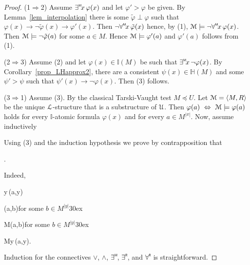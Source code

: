 \documentclass[10pt,oneside]{amsproc}
\begin{document}
\begin{proof}
  (1$\Rightarrow$2) Assume $\existsM x\,\varphi(x)$ and let $\varphi'>\varphi$ be given.
  By Lemma~\ref{lem_interpolation} there is some $\tilde{\varphi}\perp\varphi$ such that  $\varphi(x)\rightarrow\neg\tilde{\varphi}(x)\rightarrow\varphi'(x)$.
  Then $\neg\forallM x\,\tilde{\varphi}(x)$ hence, by (1), ${\EuScript M}\models\neg\forallM x\,\varphi(x)$.
  Then ${\EuScript M}\models\neg\tilde{\varphi}(a)$ for some $a\in M$. Hence ${\EuScript M}\models\varphi'(a)$ and $\varphi'(a)$ follows from (1).

  (2$\Rightarrow$3)
  Assume (2) and let $\varphi(x)\in\mathds{I}(M)$ be such that $\existsM x\,\neg\varphi(x)$.
  By Corollary~\ref{prop_LHapprox2}, there are a consistent $\psi(x)\in\mathds{H}(M)$ and some $\psi'>\psi$ such that $\psi'(x)\rightarrow\neg\varphi(x)$.
  Then (3) follows.

  (3$\Rightarrow$1)
  Assume (3).
  By the classical Tarski-Vaught test $M\preceq U$.
  Let ${\EuScript M}=\langle M,R\rangle$ be the unique  ${\EuScript L}$-structure that is a substructure of ${\EuScript U}$.
  Then  $\varphi(a)\ \Leftrightarrow\ {\EuScript M}\models\varphi(a)$ holds for every $\mathds{I}$-atomic formula $\varphi(x)$ and for every $a\in M^{|x|}$.
  Now, assume inductively
  

  Using (3) and the induction hypothesis we prove by contrapposition that

  .

  Indeed,

  {\Rightarrow}{\existsM y\,\neg\varphi(a,y)}
  
  \ceq{}
  {\Rightarrow}
  {\neg\varphi(a,b)}\hfill for some $b\in M^{|y|}$\kern30ex

  \ceq{}
  {\Rightarrow}
  {{\EuScript M}\models\neg\varphi(a,b)}\hfill for some $b\in M^{|y|}$\kern30ex

  \ceq{}
  {\Rightarrow}
  {{\EuScript M}\not\models\forallM y\,\varphi(a,y).}

  Induction for the connectives $\vee$, $\wedge$, $\existsM $, $\existsR $, and $\forallR $ is straightforward.
\end{proof}

\end{document}

